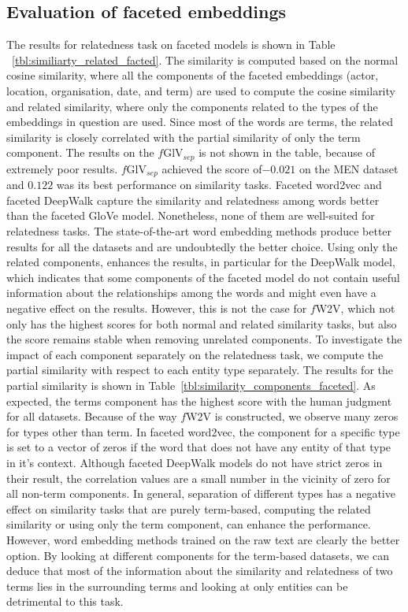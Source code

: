 \subsection{Evaluation of faceted embeddings}\label{subsec:eval_faceted}
The results for relatedness task on faceted models is shown in Table ~\ref{tbl:similiarty_related_facted}. The similarity is computed based on the normal cosine similarity, where all the components of the faceted embeddings (actor, location, organisation, date, and term) are used to compute the cosine similarity and related similarity, where only the components related to the types of the embeddings in question are used. Since most of the words are terms, the related similarity is closely correlated with the partial similarity of only the term component. The results on the $f$GlV$_{sep}$ is not shown in the table, because of extremely poor results.  $f$GlV$_{sep}$ achieved the score of$-0.021$ on the MEN dataset and $0.122$ was its best performance on similarity tasks. Faceted word2vec and faceted DeepWalk capture the similarity and relatedness among words better than the faceted GloVe model. Nonetheless, none of them are well-suited for relatedness tasks. The state-of-the-art word embedding methods produce better results for all the datasets and are undoubtedly the better choice. Using only the related components, enhances the results, in particular for the DeepWalk model, which indicates that some components of the faceted model do not contain useful information about the relationships among the words and might even have a negative effect on the results. However, this is not the case for $f$W2V, which not only has the highest scores for both normal and related similarity tasks, but also the score remains stable when removing unrelated components. To investigate the impact of each component separately on the relatedness task, we compute the partial similarity with respect to each entity type separately. The results for the partial similarity is shown in Table~\ref{tbl:similarity_components_faceted}. As expected, the terms component has the highest score with the human judgment for all datasets. Because of the way $f$W2V is constructed, we observe many zeros for types other than term. In faceted word2vec, the component for a specific type is set to a vector of zeros if the word that does not have any entity of that type in it's context. Although faceted DeepWalk models do not have strict zeros in their result, the correlation values are a small number in the vicinity of zero for all non-term components. In general, separation of different types has a negative effect on similarity tasks that are purely term-based, computing the related similarity or using only the term component, can enhance the performance. However, word embedding methods trained on the raw text are clearly the better option. By looking at different components for the term-based datasets, we can deduce that most of the information about the similarity and relatedness of two terms lies in the surrounding terms and looking at only entities can be detrimental to this task. \\ 
